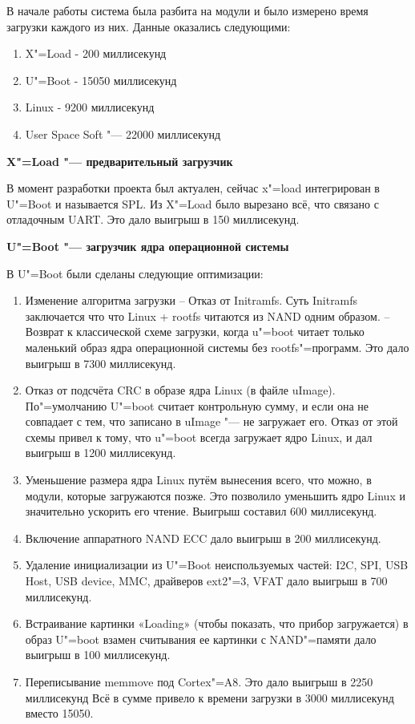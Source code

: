 \documentclass[10pt, a5paper]{article}
\begin{document}
В начале работы система была разбита на модули и было измерено время загрузки каждого из них. Данные оказались следующими:

\begin{enumerate}
  \item X"=Load	- 200 миллисекунд
  \item U"=Boot	- 15050 миллисекунд
  \item Linux	- 9200 миллисекунд
  \item User Space Soft "--- 22000 миллисекунд
\end{enumerate}

\textbf{X"=Load "--- предварительный загрузчик}

В момент разработки проекта был актуален, сейчас x"=load интегрирован в U"=Boot и называется SPL.
Из X"=Load было вырезано всё, что связано с отладочным UART. Это дало выигрыш в 150 миллисекунд.

\textbf{U"=Boot "--- загрузчик ядра операционной системы}

В U"=Boot были сделаны следующие оптимизации:

\begin{enumerate}
  \item Изменение алгоритма загрузки
  -- Отказ от Initramfs. Суть Initramfs заключается что что Linux + rootfs читаются из NAND одним образом.
  -- Возврат к классической схеме загрузки, когда u"=boot читает только маленький образ ядра операционной системы без rootfs"=программ.
  Это дало выигрыш в 7300 миллисекунд.
  \item Отказ от подсчёта CRC в образе ядра Linux (в файле uImage). По"=умолчанию U"=boot считает контрольную сумму, и если она не совпадает с тем, что записано в uImage "--- не загружает его. Отказ от этой схемы привел к тому, что u"=boot всегда загружает ядро Linux, и дал выигрыш в 1200 миллисекунд.
  \item Уменьшение размера ядра Linux путём вынесения всего, что можно, в модули, которые загружаются позже. Это позволило уменьшить ядро Linux и значительно ускорить его чтение. Выигрыш составил 600 миллисекунд.
  \item Включение аппаратного NAND ECC дало выигрыш в 200 миллисекунд.
  \item Удаление инициализации из U"=Boot неиспользуемых частей: I2C, SPI, USB Host, USB device, MMC, драйверов ext2"=3, VFAT дало выигрыш в 700 миллисекунд.
  \item Встраивание картинки «Loading» (чтобы показать, что прибор загружается) в образ U"=boot взамен считывания ее картинки с NAND"=памяти дало выигрыш в 100 миллисекунд.
  \item Переписывание memmove под Cortex"=A8. Это дало выигрыш в 2250 миллисекунд
Всё в сумме привело к времени загрузки в 3000 миллисекунд вместо 15050.
\end{enumerate}
\end{document}
